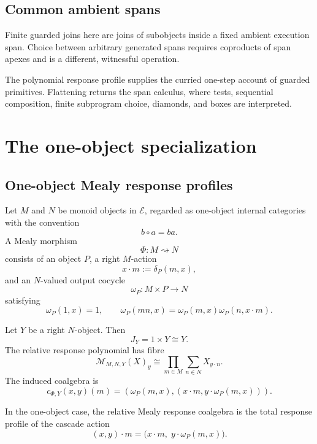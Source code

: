 \subsection{Common ambient spans}
\label{subsec:poly-relative-common-ambient-spans}

\begin{remark}
\label{rem:poly-relative-common-ambient-spans}
Finite guarded joins here are joins of subobjects inside a fixed ambient
execution span.  Choice between arbitrary generated spans requires coproducts
of span apexes and is a different, witnessful operation.
\end{remark}

\begin{remark}
\label{rem:poly-relative-program-algebra-from-polynomial}
The polynomial response profile supplies the curried one-step account of
guarded primitives.  Flattening returns the span calculus, where tests,
sequential composition, finite subprogram choice, diamonds, and boxes are
interpreted.
\end{remark}

\section{The one-object specialization}
\label{sec:poly-relative-one-object-specialization}

\subsection{One-object Mealy response profiles}
\label{subsec:poly-relative-one-object-response-profiles}

Let \(M\) and \(N\) be monoid objects in \(\mathcal E\), regarded as
one-object internal categories with the convention
\[
b\circ a=ba.
\]
A Mealy morphism
\[
\Phi:M\rightsquigarrow N
\]
consists of an object \(P\), a right \(M\)-action
\[
x\cdot m:=\delta_P(m,x),
\]
and an \(N\)-valued output cocycle
\[
\omega_P:M\times P\to N
\]
satisfying
\[
\omega_P(1,x)=1,
\qquad
\omega_P(mn,x)=\omega_P(m,x)\omega_P(n,x\cdot m).
\]

Let \(Y\) be a right \(N\)-object.  Then
\[
J_Y=1\times Y\cong Y.
\]
The relative response polynomial has fibre
\[
\mathcal M_{M,N,Y}(X)_y
\cong
\prod_{m\in M}
\sum_{n\in N}
X_{y\cdot n}.
\]
The induced coalgebra is
\[
c_{\Phi,Y}(x,y)(m)
=
\left(
\omega_P(m,x),
\left(
x\cdot m,
y\cdot\omega_P(m,x)
\right)
\right).
\]

\begin{proposition}
\label{prop:poly-relative-one-object-cascade-response}
In the one-object case, the relative Mealy response coalgebra is the total
response profile of the cascade action
\[
(x,y)\cdot m
=
\bigl(x\cdot m,\;y\cdot\omega_P(m,x)\bigr).
\]
\end{proposition}


